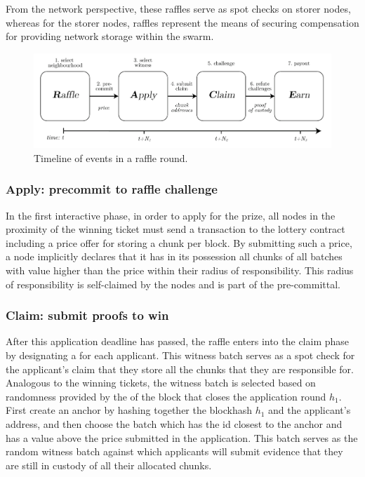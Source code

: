 From the network perspective, these raffles serve as spot checks on storer nodes, whereas for the storer nodes, raffles represent the means of securing compensation for providing network storage within the swarm. 


\begin{figure}[htbp]
  \centering
  \includegraphics[width=\textwidth]{fig/postage_race.pdf}
  \caption[Timeline of events in a raffle round \statusgreen]{Timeline of events in a raffle round.}
  \label{fig:raffle-timeline}
\end{figure}


\subsubsection{Apply: precommit to raffle challenge}

In the first interactive phase, in order to apply for the prize, all nodes in the proximity of the winning ticket must send a transaction to the lottery contract including a price offer for storing a chunk per block. By submitting such a price, a node implicitly declares that it has in its possession all chunks of all batches with value higher than the price within their radius of responsibility. This radius of responsibility is self-claimed by the nodes and is part of the pre-committal.


\subsubsection{Claim: submit proofs to win}

After this application deadline has passed, the raffle enters into the claim phase by designating a  for each applicant. This witness batch serves as a spot check for the applicant's claim that they store all the chunks that they are responsible for. Analogous to the winning tickets, the witness batch is selected based on randomness provided by the  of the block that closes the application round $h_1$. First create an anchor by hashing together the blockhash $h_1$ and the applicant's address, and then  choose the batch which has the id closest to the anchor and has a value above the price submitted in the application. This batch serves as the random witness batch against which applicants will submit evidence that they are still in custody of all their allocated chunks. 

